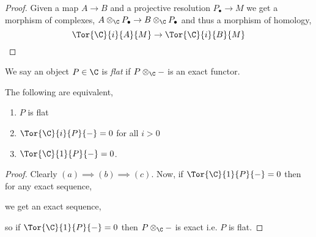 \documentclass[12pt]{article}
\begin{document}
\begin{proof}
Given a map $A \to B$ and a projective resolution $P_\bullet \to M$ we get a morphism of complexes, $A \otimes_\C P_\bullet \to B \otimes_\C P_\bullet$ and thus a morphism of homology,
\[ \Tor{\C}{i}{A}{M} \to \Tor{\C}{i}{B}{M} \]
\end{proof}

\begin{defn}
We say an object $P \in \C$ is \textit{flat} if $P \otimes_\C - $ is an exact functor.
\end{defn}

\begin{lemma}
The following are equivalent,
\begin{enumerate}
\item $P$ is flat
\item $\Tor{\C}{i}{P}{-} = 0$ for all $i > 0$
\item $\Tor{\C}{1}{P}{-} = 0$.
\end{enumerate}
\end{lemma}

\begin{proof}
Clearly $(a) \implies (b) \implies (c)$. Now, if $\Tor{\C}{1}{P}{-} = 0$ then for any exact sequence,
\begin{center}
\end{center}
we get an exact sequence,
\begin{center}
\end{center}
so if $\Tor{\C}{1}{P}{-} = 0$ then $P \otimes_\C -$ is exact i.e. $P$ is flat.
\end{proof}
\end{document}
